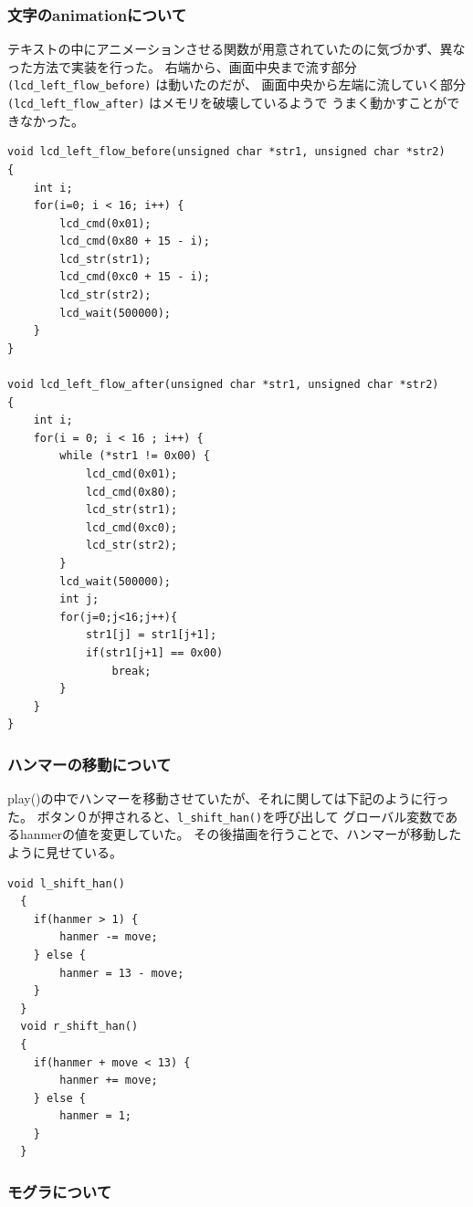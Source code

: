 \documentclass[11pt,a4j]{jsarticle}
\begin{document}
\subsubsection{文字のanimationについて}
\label{subs:文字のanimationについて}

テキストの中にアニメーションさせる関数が用意されていたのに気づかず、異なった方法で実装を行った。
右端から、画面中央まで流す部分 \verb|(lcd_left_flow_before)| は動いたのだが、
画面中央から左端に流していく部分 \verb|(lcd_left_flow_after)| はメモリを破壊しているようで
うまく動かすことができなかった。

\begin{lstlisting}[basicstyle=\ttfamily\footnotesize, frame=single]
void lcd_left_flow_before(unsigned char *str1, unsigned char *str2)
{
	int i;
	for(i=0; i < 16; i++) {
		lcd_cmd(0x01);
		lcd_cmd(0x80 + 15 - i);
		lcd_str(str1);
		lcd_cmd(0xc0 + 15 - i);
		lcd_str(str2);
		lcd_wait(500000);
	}
}

void lcd_left_flow_after(unsigned char *str1, unsigned char *str2)
{
	int i;
	for(i = 0; i < 16 ; i++) {
		while (*str1 != 0x00) {
			lcd_cmd(0x01);
			lcd_cmd(0x80);
			lcd_str(str1);
			lcd_cmd(0xc0);
			lcd_str(str2);
		}
		lcd_wait(500000);
		int j;
		for(j=0;j<16;j++){
			str1[j] = str1[j+1];
			if(str1[j+1] == 0x00)
				break;
		}
	}
}
\end{lstlisting}

\subsubsection{ハンマーの移動について}
\label{subs:ハンマーの移動について}

play()の中でハンマーを移動させていたが、それに関しては下記のように行った。
ボタン０が押されると、\verb|l_shift_han()|を呼び出して
グローバル変数であるhanmerの値を変更していた。
その後描画を行うことで、ハンマーが移動したように見せている。

\begin{lstlisting}[basicstyle=\ttfamily\footnotesize, frame=single]
  void l_shift_han()
  {
  	if(hanmer > 1) {
  		hanmer -= move;
  	} else {
  		hanmer = 13 - move;
  	}
  }
  void r_shift_han()
  {
  	if(hanmer + move < 13) {
  		hanmer += move;
  	} else {
  		hanmer = 1;
  	}
  }
\end{lstlisting}

\subsubsection{モグラについて}
\label{subs:モグラについて}
\end{document}
